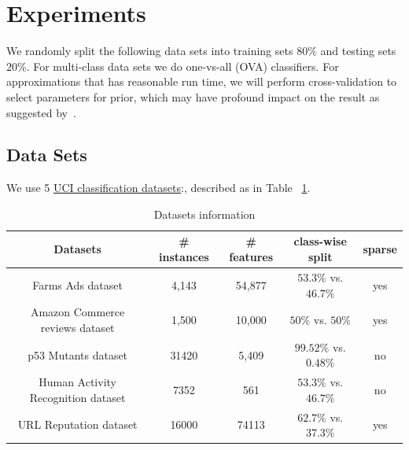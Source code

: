 \section{Experiments}
\label{sec:experiments}

We randomly split the following data sets into training sets $80\%$ and
testing sets $20\%$. For multi-class data sets we do one-vs-all (OVA)
classifiers. For approximations that has reasonable run time, we will perform
cross-validation to select parameters for prior, which may have profound
impact on the result as suggested by~\cite{Asuncion2009smoothing}. 

\subsection{Data Sets}


We use 5 \href{http://archive.ics.uci.edu/ml/datasets.html}{UCI classification
datasets}:, described as in Table ~\ref{tb:datasets}.

\begin{table}

\begin{tabular}{| c | c |  c | c | c |}
  \hline
  Datasets & \# instances & \# features & class-wise split & sparse\\
  \hline
  Farms Ads dataset & 4,143 & 54,877 & $53.3\%$ vs. $46.7\%$ & yes\\
  \hline
  Amazon Commerce reviews dataset & 1,500 & 10,000 & $50\%$ vs. $50\%$ & yes \\
  \hline
  p53 Mutants dataset & 31420 & 5,409 & $99.52\%$ vs.$0.48\%$  & no\\
  \hline
  Human Activity Recognition dataset & 7352 & 561 & $53.3\%$ vs. $46.7\%$  & no\\
  \hline
  URL Reputation dataset\footnotemark[1] & 16000 & 74113 & $62.7\%$ vs. $37.3\%$ & yes \\
  \hline
\end{tabular}
\caption{Datasets information}
\label{tb:datasets}
\end{table}

